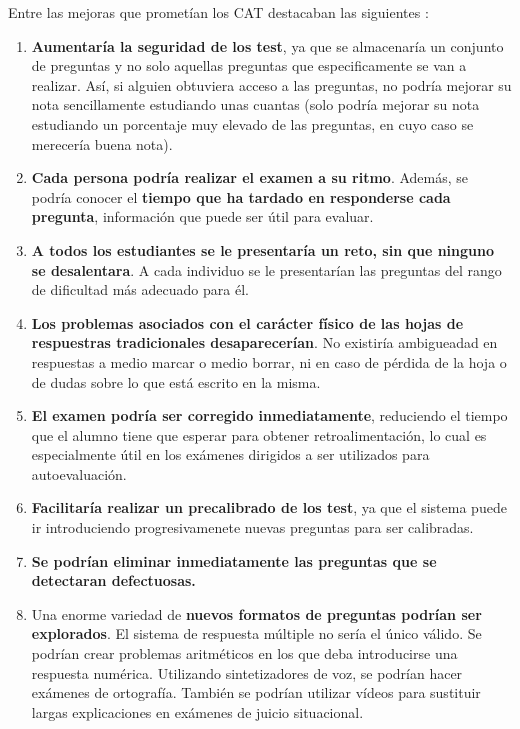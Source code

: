 Entre las mejoras que prometían los \acrshort{CAT} destacaban las siguientes \cite{Green83}:

\begin{enumerate}
	\item \textbf{Aumentaría la seguridad de los test}, ya que se almacenaría un conjunto de preguntas y no solo aquellas preguntas que especificamente se van a realizar. Así, si alguien obtuviera acceso a las preguntas, no podría mejorar su nota sencillamente estudiando unas cuantas (solo podría mejorar su nota estudiando un porcentaje muy elevado de las preguntas, en cuyo caso se merecería buena nota).
	\item \textbf{Cada persona podría realizar el examen a su ritmo}. Además, se podría conocer el \textbf{tiempo que ha tardado en responderse cada pregunta}, información que puede ser útil para evaluar.
	\item \textbf{A todos los estudiantes se le presentaría un reto, sin que ninguno se desalentara}. A cada individuo se le presentarían las preguntas del rango de dificultad más adecuado para él.
	\item \textbf{Los problemas asociados con el carácter físico de las hojas de respuestras tradicionales desaparecerían}. No existiría ambigueadad en respuestas a medio marcar o medio borrar, ni en caso de pérdida de la hoja o de dudas sobre lo que está escrito en la misma.
	\item \textbf{El examen podría ser corregido inmediatamente}, reduciendo el tiempo que el alumno tiene que esperar para obtener retroalimentación, lo cual es especialmente útil en los exámenes dirigidos a ser utilizados para autoevaluación.
	\item \textbf{Facilitaría realizar un precalibrado de los test}, ya que el sistema puede ir introduciendo progresivamenete nuevas preguntas para ser calibradas.
	\item \textbf{Se podrían eliminar inmediatamente las preguntas que se detectaran defectuosas.}
	\item Una enorme variedad de \textbf{nuevos formatos de preguntas podrían ser explorados}. El sistema de respuesta múltiple no sería el único válido. Se podrían crear problemas aritméticos en los que deba introducirse una respuesta numérica. Utilizando sintetizadores de voz, se podrían hacer exámenes de ortografía. También se podrían utilizar vídeos para sustituir largas explicaciones en exámenes de juicio situacional.
\end{enumerate}

